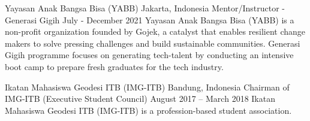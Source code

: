 \resumeSubheading
{Yayasan Anak Bangsa Bisa (YABB)}
{Jakarta, Indonesia}
{Mentor/Instructor - Generasi Gigih}
{July - December 2021}
\small{Yayasan Anak Bangsa Bisa (YABB) is a non-profit organization founded by Gojek, a
catalyst that enables resilient change makers to solve pressing challenges and build
sustainable communities. Generasi Gigih programme focuses on generating tech-talent
by conducting an intensive boot camp to prepare fresh graduates for the tech industry.}
\vspace{-1pt}
\resumeItemListStart
{}
\resumeItemListEnd

\vspace{5pt}
\resumeSubheading
{Ikatan Mahasiswa Geodesi ITB (IMG-ITB)}
{Bandung, Indonesia}
{Chairman of IMG-ITB (Executive Student Council)}
{August 2017 – March 2018}
\small{Ikatan Mahasiswa Geodesi ITB (IMG-ITB) is a profession-based student association.}
\vspace{-1pt}
\resumeItemListStart
{}
\resumeItemListEnd
